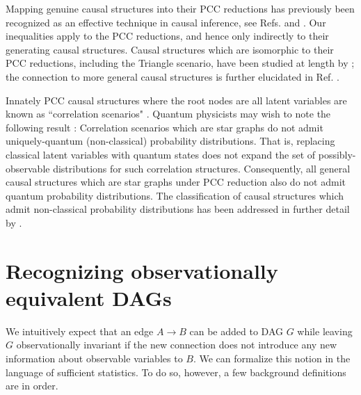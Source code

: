 Mapping genuine causal structures into their PCC reductions has previously been recognized as an effective technique in causal inference, see Refs. \citep[Thm. 2.4]{fritz2012bell} and \citep[Sec. 5]{BilocalCorrelations}. Our inequalities apply to the PCC reductions, and hence only indirectly to their generating causal structures. Causal structures which are isomorphic to their PCC reductions, including the Triangle scenario, have been studied at length by \citet{fritz2012bell}; the connection to more general causal structures is further elucidated in Ref. \cite{BeyondBellII}.

Innately PCC causal structures where the root nodes are all latent variables are known as ``correlation scenarios" \cite{fritz2012bell}. Quantum physicists may wish to note the following result \citep[Thm.~3.8]{fritz2012bell}: Correlation scenarios which are star graphs \citep[Fig.~6]{fritz2012bell} do not admit uniquely-quantum (non-classical) probability distributions. That is, replacing classical latent variables with quantum states does not expand the set of possibly-observable distributions for such correlation structures. Consequently, all general causal structures which are star graphs under PCC reduction also do not admit quantum probability distributions.  The classification of causal structures which admit non-classical probability distributions has been addressed in further detail by \citet{pusey2014gdag}. 

\section{Recognizing observationally equivalent DAGs}



We intuitively expect that an edge $A\to B$ can be added to DAG $G$ while leaving $G$ observationally invariant if the new connection does not introduce any new information about observable variables to $B$. %
We can formalize this notion in the language of sufficient statistics. To do so, however, a few background definitions are in order.

